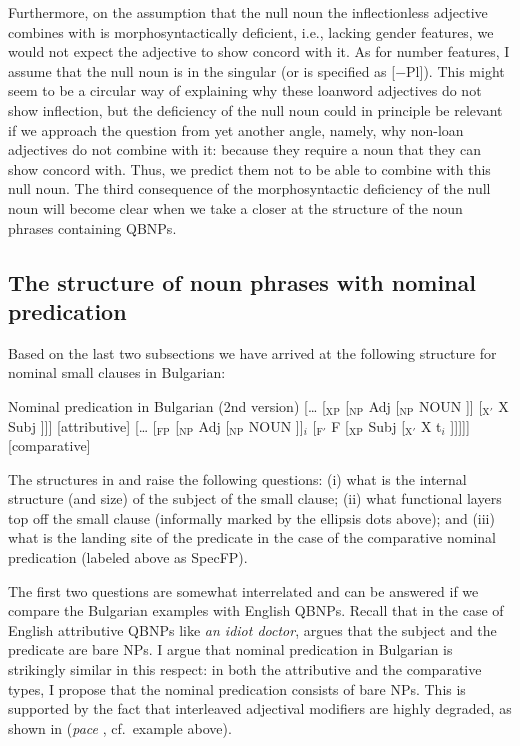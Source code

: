 \documentclass[output=paper]{langscibook}
\begin{document}
Furthermore, on the assumption that the null noun the inflectionless adjective combines with is morphosyntactically deficient, i.e., lacking gender features, we would not expect the adjective to show concord with it. As for number features, I assume that the null noun is in the singular (or is specified as [$\minus$Pl]). This might seem to be a circular way of explaining why these loanword adjectives do not show inflection, but the deficiency of the null noun could in principle be relevant if we  approach the question from yet another angle, namely, why non-loan adjectives do not combine with it: because they require a noun that they can show concord with. Thus, we predict them not to be able to combine with this null noun. The third consequence of the morphosyntactic deficiency of the null noun will become clear when we take a closer at the structure of the noun phrases containing QBNPs.  

\subsection{The structure of noun phrases with nominal predication} \label{ge-sec:3.2.3}

Based on the last two subsections we have arrived at the following structure for nominal small clauses in Bulgarian:

\ea Nominal predication in Bulgarian (2nd version)
\ea \label{ge-br-bgattr2}
[\ldots{} [$_\text{XP}$ [$_\text{NP}$ Adj [$_\text{NP}$ NOUN ]] [$_{\text{X}'}$ X Subj ]]] \hfill [attributive]
\ex \label{ge-br-bgcmpr2}
[\ldots{} [$_\text{FP}$ [$_\text{NP}$ Adj [$_\text{NP}$ NOUN ]]$_{i}$ [$_{\text{F}'}$ F [$_\text{XP}$ Subj [$_{\text{X}'}$ X t$_{i}$ ]]]]] \hfill [comparative]
\z 
\z

\noindent The structures in  and  raise the following questions: (i) what is the internal structure (and size) of the subject of the small clause; (ii) what functional layers top off the small clause (informally marked by the ellipsis dots above); and (iii) what is the landing site of the predicate in the case of the comparative nominal predication (labeled above as SpecFP). 

The first two questions are somewhat interrelated and can be answered if we compare the Bulgarian examples with English QBNPs. Recall that in the case of English attributive QBNPs like \emph{an idiot doctor}, \citet{denDikken2006} argues that the subject and the predicate are bare NPs. I argue that nominal predication in Bulgarian is strikingly similar in this respect: in both the attributive and the comparative types, I propose that the nominal predication consists of bare NPs. This is supported by the fact that interleaved adjectival modifiers are highly degraded, as shown in  (\emph{pace} \citealt{Adamson2019PhD}, cf.\ example  above).
\end{document}
